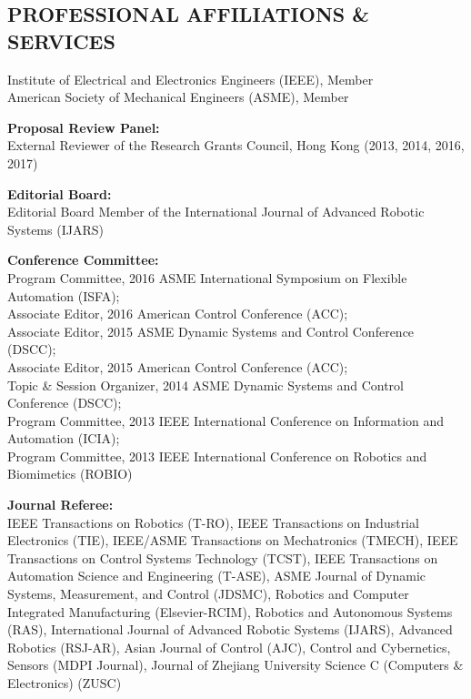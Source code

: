 \documentclass{res}
\begin{document}
\begin{resume}
\section{PROFESSIONAL AFFILIATIONS \& SERVICES}
\vspace{0.1in}
    Institute of Electrical and Electronics Engineers (IEEE), Member \\ %
    American Society of Mechanical Engineers (ASME), Member %

    \textbf{Proposal Review Panel:}\\ %
    External Reviewer of the Research Grants Council, Hong Kong (2013, 2014, 2016, 2017) 

    \textbf{Editorial Board:}\\ %
    Editorial Board Member of the International Journal of Advanced Robotic Systems (IJARS)

    \textbf{Conference Committee:}\\ %
    Program Committee, 2016 ASME International Symposium on Flexible Automation (ISFA);\\
    Associate Editor, 2016 American Control Conference (ACC);\\
    Associate Editor, 2015 ASME Dynamic Systems and Control Conference (DSCC);\\
    Associate Editor, 2015 American Control Conference (ACC);\\
    Topic \& Session Organizer, 2014 ASME Dynamic Systems and Control Conference (DSCC);\\
    Program Committee, 2013 IEEE International Conference on Information and Automation (ICIA);\\
    Program Committee, 2013 IEEE International Conference on Robotics and Biomimetics (ROBIO)%

    \textbf{Journal Referee:}\\
    IEEE Transactions on Robotics (T-RO),
    IEEE Transactions on Industrial Electronics (TIE),
    IEEE/ASME Transactions on Mechatronics (TMECH),
    IEEE Transactions on Control Systems Technology (TCST),
    IEEE Transactions on Automation Science and Engineering (T-ASE),
    ASME Journal of Dynamic Systems, Measurement, and Control (JDSMC),
    Robotics and Computer Integrated Manufacturing (Elsevier-RCIM),
    Robotics and Autonomous Systems (RAS),
    International Journal of Advanced Robotic Systems (IJARS),
    Advanced Robotics (RSJ-AR),
    Asian Journal of Control (AJC),
    Control and Cybernetics,
    Sensors (MDPI Journal),
    Journal of Zhejiang University Science C (Computers \& Electronics) (ZUSC)


\end{resume}
\end{document}
